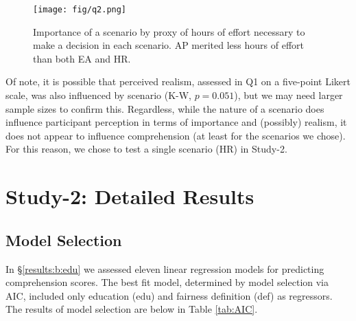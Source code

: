\documentclass{article}
\newcommand{\studyB}{Study-2}
\begin{document}
\begin{figure}[ht]
    \centering
    \texttt{[image: fig/q2.png]}
    \vspace{-10pt}
    \caption{Importance of a scenario by proxy of hours of effort necessary to make a decision in each scenario. AP merited less hours of effort than both EA and HR.}
    \label{fig:q2}
\end{figure}

Of note, it is possible that perceived realism, assessed in Q1 on a five-point Likert scale, was also influenced by scenario (K-W, $p=0.051$), but we may need larger sample sizes to confirm this. Regardless, while the nature of a scenario does influence participant perception in terms of importance and (possibly) realism, it does not appear to influence comprehension (at least for the scenarios we chose). For this reason, we chose to test a single scenario (HR) in \studyB{}.  



\section{\studyB{}: Detailed Results}

\subsection{Model Selection} \label{app:b:model_selection}

In \S\ref{results:b:edu} we assessed eleven linear regression models for predicting comprehension scores. The best fit model, determined by model selection via AIC, included only education (edu) and fairness definition (def) as regressors. The results of model selection are below in Table \ref{tab:AIC}.
\end{document}
